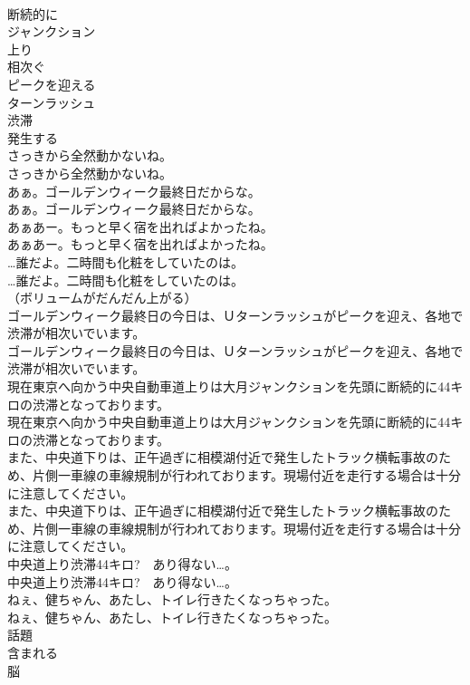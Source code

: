 \documentclass[8pt]{extreport}
\begin{document}
\begin{CJK}{UTF8}{min}
\\	断続的に
\\	ジャンクション
\\	上り
\\	相次ぐ
\\	ピークを迎える
\\	ターンラッシュ
\\	渋滞
\\	発生する
\\	さっきから全然動かないね。	
\\	さっきから全然動かないね。 
\\	あぁ。ゴールデンウィーク最終日だからな。	
\\	あぁ。ゴールデンウィーク最終日だからな。 
\\	あぁあー。もっと早く宿を出ればよかったね。	
\\	あぁあー。もっと早く宿を出ればよかったね。 
\\	…誰だよ。二時間も化粧をしていたのは。	
\\	…誰だよ。二時間も化粧をしていたのは。 
\\	（ボリュームがだんだん上がる）	
\\	ゴールデンウィーク最終日の今日は、Ｕターンラッシュがピークを迎え、各地で渋滞が相次いでいます。	
\\	ゴールデンウィーク最終日の今日は、Ｕターンラッシュがピークを迎え、各地で渋滞が相次いでいます。 
\\	現在東京へ向かう中央自動車道上りは大月ジャンクションを先頭に断続的に44キロの渋滞となっております。	
\\	現在東京へ向かう中央自動車道上りは大月ジャンクションを先頭に断続的に44キロの渋滞となっております。 
\\	また、中央道下りは、正午過ぎに相模湖付近で発生したトラック横転事故のため、片側一車線の車線規制が行われております。現場付近を走行する場合は十分に注意してください。	
\\	また、中央道下りは、正午過ぎに相模湖付近で発生したトラック横転事故のため、片側一車線の車線規制が行われております。現場付近を走行する場合は十分に注意してください。 
\\	中央道上り渋滞44キロ?　あり得ない…。	
\\	中央道上り渋滞44キロ?　あり得ない…。 
\\	ねぇ、健ちゃん、あたし、トイレ行きたくなっちゃった。	
\\	ねぇ、健ちゃん、あたし、トイレ行きたくなっちゃった。 
\\	話題
\\	含まれる
\\	脳

\end{CJK}
\end{document}
